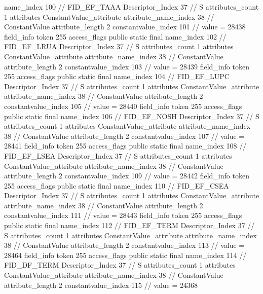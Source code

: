 {{{{{				name_index	100		// FID_EF_TAAA
				Descriptor_Index	37		// S
				attributes_count	1
				attributes {
				ConstantValue_attribute {
					attribute_name_index	38		// ConstantValue
					attribute_length	2
					constantvalue_index	101		// value = 28438
				}
				}
			}
			field_info {
				token	255
				access_flags	public static final
				name_index	102		// FID_EF_LRUA
				Descriptor_Index	37		// S
				attributes_count	1
				attributes {
				ConstantValue_attribute {
					attribute_name_index	38		// ConstantValue
					attribute_length	2
					constantvalue_index	103		// value = 28439
				}
				}
			}
			field_info {
				token	255
				access_flags	public static final
				name_index	104		// FID_EF_LUPC
				Descriptor_Index	37		// S
				attributes_count	1
				attributes {
				ConstantValue_attribute {
					attribute_name_index	38		// ConstantValue
					attribute_length	2
					constantvalue_index	105		// value = 28440
				}
				}
			}
			field_info {
				token	255
				access_flags	public static final
				name_index	106		// FID_EF_NOSH
				Descriptor_Index	37		// S
				attributes_count	1
				attributes {
				ConstantValue_attribute {
					attribute_name_index	38		// ConstantValue
					attribute_length	2
					constantvalue_index	107		// value = 28441
				}
				}
			}
			field_info {
				token	255
				access_flags	public static final
				name_index	108		// FID_EF_LSEA
				Descriptor_Index	37		// S
				attributes_count	1
				attributes {
				ConstantValue_attribute {
					attribute_name_index	38		// ConstantValue
					attribute_length	2
					constantvalue_index	109		// value = 28442
				}
				}
			}
			field_info {
				token	255
				access_flags	public static final
				name_index	110		// FID_EF_CSEA
				Descriptor_Index	37		// S
				attributes_count	1
				attributes {
				ConstantValue_attribute {
					attribute_name_index	38		// ConstantValue
					attribute_length	2
					constantvalue_index	111		// value = 28443
				}
				}
			}
			field_info {
				token	255
				access_flags	public static final
				name_index	112		// FID_EF_TERM
				Descriptor_Index	37		// S
				attributes_count	1
				attributes {
				ConstantValue_attribute {
					attribute_name_index	38		// ConstantValue
					attribute_length	2
					constantvalue_index	113		// value = 28464
				}
				}
			}
			field_info {
				token	255
				access_flags	public static final
				name_index	114		// FID_DF_TERM
				Descriptor_Index	37		// S
				attributes_count	1
				attributes {
				ConstantValue_attribute {
					attribute_name_index	38		// ConstantValue
					attribute_length	2
					constantvalue_index	115		// value = 24368
}}}}}}}
